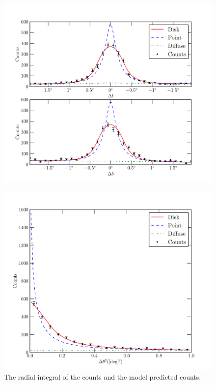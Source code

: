\documentclass[preprint]{aastex}
\begin{document}
\clearpage
\begin{figure}
  \begin{center}
    \includegraphics{ic443_plots/ic443_counts_slice.pdf}
    \caption{
    }
    \label{counts_slice}
  \end{center}
\end{figure}

\clearpage
\begin{figure}
  \begin{center}
    \includegraphics{ic443_plots/ic443_radial_integral.pdf}
    \caption{The radial integral of the counts and the model predicted counts.}
    \label{radial_profile}
  \end{center}
\end{figure}
\end{document}
